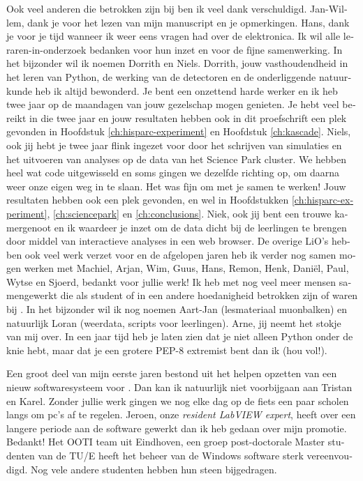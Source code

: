 \begin{otherlanguage}{dutch}
Ook veel anderen die betrokken zijn bij \hisparc ben ik veel dank
verschuldigd. Jan-Willem, dank je voor het lezen van mijn manuscript en je
opmerkingen.  Hans, dank je voor je tijd wanneer ik weer eens vragen had
over de elektronica.  Ik wil alle leraren-in-onderzoek bedanken voor hun
inzet en voor de fijne samenwerking.  In het bijzonder wil ik noemen
Dorrith en Niels.  Dorrith, jouw vasthoudendheid in het leren van Python,
de werking van de detectoren en de onderliggende natuurkunde heb ik altijd
bewonderd.  Je bent een onzettend harde werker en ik heb twee jaar op de
maandagen van jouw gezelschap mogen genieten.  Je hebt veel bereikt in die
twee jaar en jouw resultaten hebben ook in dit proefschrift een plek
gevonden in Hoofdstuk \ref{ch:hisparc-experiment} en Hoofdstuk
\ref{ch:kascade}.  Niels, ook jij hebt je twee jaar flink ingezet voor
\hisparc door het schrijven van simulaties en het uitvoeren van analyses
op de data van het Science Park cluster.  We hebben heel wat code
uitgewisseld en soms gingen we dezelfde richting op, om daarna weer onze
eigen weg in te slaan.  Het was fijn om met je samen te werken!  Jouw
resultaten hebben ook een plek gevonden, en wel in Hoofdstukken
\ref{ch:hisparc-experiment}, \ref{ch:sciencepark} en \ref{ch:conclusions}.
Niek, ook jij bent een trouwe kamergenoot en ik waardeer je inzet om de
\hisparc data dicht bij de leerlingen te brengen door middel van
interactieve analyses in een web browser.  De overige LiO's hebben ook
veel werk verzet voor \hisparc en de afgelopen jaren heb ik verder nog
samen mogen werken met Machiel, Arjan, Wim, Guus, Hans, Remon, Henk,
Daniël, Paul, Wytse en Sjoerd, bedankt voor jullie werk!  Ik heb met nog
veel meer mensen samengewerkt die als student of in een andere
hoedanigheid betrokken zijn of waren bij \hisparc.  In het bijzonder wil
ik nog noemen Aart-Jan (lesmateriaal muonbalken) en natuurlijk Loran
(weerdata, scripts voor leerlingen).  Arne, jij neemt het stokje van mij
over.  In een jaar tijd heb je laten zien dat je niet alleen Python onder
de knie hebt, maar dat je een grotere PEP-8 extremist bent dan ik (hou
vol!).  

Een groot deel van mijn eerste jaren bestond uit het helpen opzetten van
een nieuw softwaresysteem voor \hisparc.  Dan kan ik natuurlijk niet
voorbijgaan aan Tristan en Karel.  Zonder jullie werk gingen we nog elke
dag op de fiets een paar scholen langs om pc's af te regelen.  Jeroen,
onze \emph{resident LabVIEW expert}, heeft over een langere periode aan de
\daq software gewerkt dan ik heb gedaan over mijn promotie.  Bedankt!  Het
OOTI team uit Eindhoven, een groep post-doctorale Master studenten van de
TU/E heeft het beheer van de Windows software sterk vereenvoudigd.  Nog
vele andere studenten hebben hun steen bijgedragen.


\end{otherlanguage}
